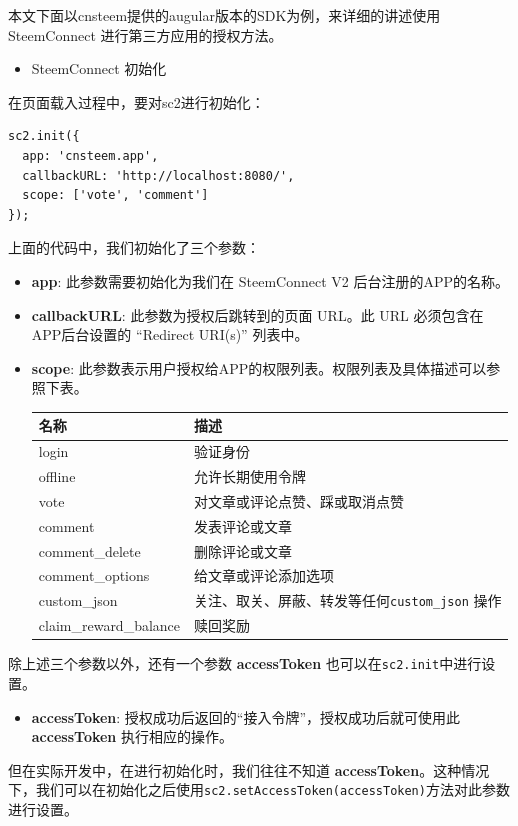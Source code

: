 \documentclass[]{ctexbook}
\providecommand{\tightlist}{%
  \setlength{\itemsep}{0pt}\setlength{\parskip}{0pt}}
\begin{document}
本文下面以cnsteem提供的augular版本的SDK为例，来详细的讲述使用 SteemConnect 进行第三方应用的授权方法。

\begin{itemize}
\tightlist
\item
  SteemConnect 初始化
\end{itemize}

在页面载入过程中，要对sc2进行初始化：

\begin{verbatim}
sc2.init({
  app: 'cnsteem.app',
  callbackURL: 'http://localhost:8080/',
  scope: ['vote', 'comment']
});
\end{verbatim}

上面的代码中，我们初始化了三个参数：

\begin{itemize}
\item
  \textbf{app}: 此参数需要初始化为我们在 SteemConnect V2 后台注册的APP的名称。
\item
  \textbf{callbackURL}: 此参数为授权后跳转到的页面 URL。此 URL 必须包含在APP后台设置的 ``Redirect URI(s)'' 列表中。
\item
  \textbf{scope}: 此参数表示用户授权给APP的权限列表。权限列表及具体描述可以参照下表。

  \begin{longtable}[]{@{}ll@{}}
  \toprule
  名称 & 描述\tabularnewline
  \midrule
  \endhead
  login & 验证身份\tabularnewline
  offline & 允许长期使用令牌\tabularnewline
  vote & 对文章或评论点赞、踩或取消点赞\tabularnewline
  comment & 发表评论或文章\tabularnewline
  comment\_delete & 删除评论或文章\tabularnewline
  comment\_options & 给文章或评论添加选项\tabularnewline
  custom\_json & 关注、取关、屏蔽、转发等任何\texttt{custom\_json} 操作\tabularnewline
  claim\_reward\_balance & 赎回奖励\tabularnewline
  \bottomrule
  \end{longtable}
\end{itemize}

除上述三个参数以外，还有一个参数 \textbf{accessToken} 也可以在\texttt{sc2.init}中进行设置。

\begin{itemize}
\tightlist
\item
  \textbf{accessToken}: 授权成功后返回的``接入令牌''，授权成功后就可使用此\textbf{accessToken} 执行相应的操作。
\end{itemize}

但在实际开发中，在进行初始化时，我们往往不知道 \textbf{accessToken}。这种情况下，我们可以在初始化之后使用\texttt{sc2.setAccessToken(accessToken)}方法对此参数进行设置。
\end{document}
